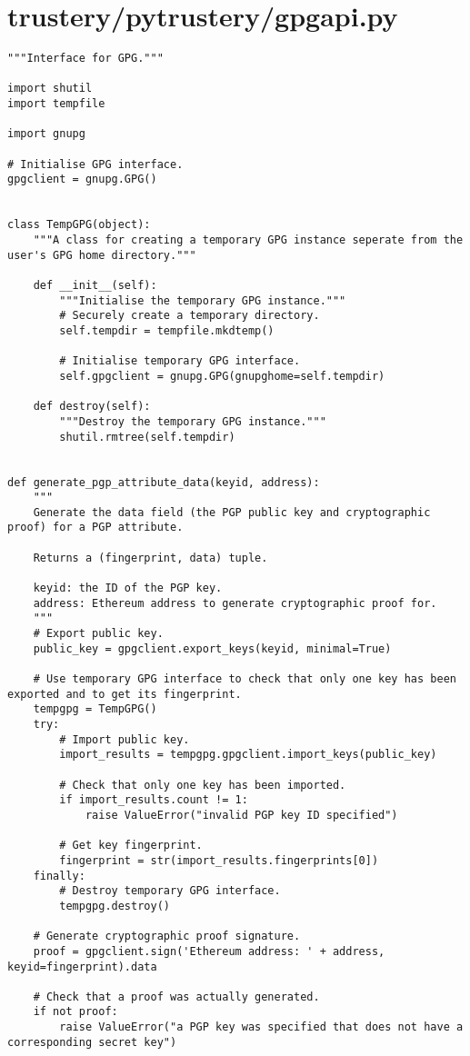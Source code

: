 \documentclass[12pt]{report}
\begin{document}
	\section{trustery/pytrustery/gpgapi.py}
	\begin{lstlisting}
"""Interface for GPG."""

import shutil
import tempfile

import gnupg

# Initialise GPG interface.
gpgclient = gnupg.GPG()


class TempGPG(object):
    """A class for creating a temporary GPG instance seperate from the user's GPG home directory."""

    def __init__(self):
        """Initialise the temporary GPG instance."""
        # Securely create a temporary directory.
        self.tempdir = tempfile.mkdtemp()

        # Initialise temporary GPG interface.
        self.gpgclient = gnupg.GPG(gnupghome=self.tempdir)

    def destroy(self):
        """Destroy the temporary GPG instance."""
        shutil.rmtree(self.tempdir)


def generate_pgp_attribute_data(keyid, address):
    """
    Generate the data field (the PGP public key and cryptographic proof) for a PGP attribute.

    Returns a (fingerprint, data) tuple.

    keyid: the ID of the PGP key.
    address: Ethereum address to generate cryptographic proof for.
    """
    # Export public key.
    public_key = gpgclient.export_keys(keyid, minimal=True)

    # Use temporary GPG interface to check that only one key has been exported and to get its fingerprint.
    tempgpg = TempGPG()
    try:
        # Import public key.
        import_results = tempgpg.gpgclient.import_keys(public_key)

        # Check that only one key has been imported.
        if import_results.count != 1:
            raise ValueError("invalid PGP key ID specified")

        # Get key fingerprint.
        fingerprint = str(import_results.fingerprints[0])
    finally:
        # Destroy temporary GPG interface.
        tempgpg.destroy()

    # Generate cryptographic proof signature.
    proof = gpgclient.sign('Ethereum address: ' + address, keyid=fingerprint).data

    # Check that a proof was actually generated.
    if not proof:
        raise ValueError("a PGP key was specified that does not have a corresponding secret key")


\end{lstlisting}
\end{document}

